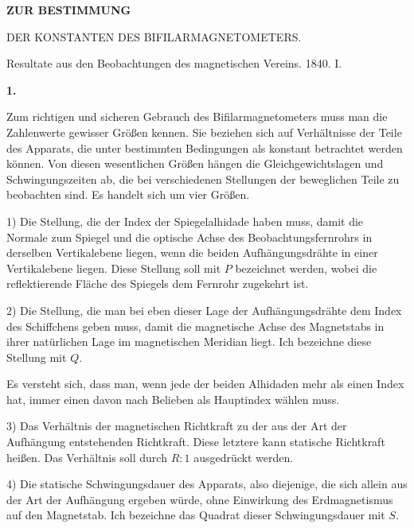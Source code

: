 \clearpage
{}
\begin{center}
{\Large\bfseries ZUR BESTIMMUNG\par\medskip DER KONSTANTEN DES BIFILARMAGNETOMETERS.}
\par\bigskip
Resultate aus den Beobachtungen des magnetischen Vereins. 1840. I.
\end{center}
\renewcommand{\Article}[1]{\par\medskip\Needspace{4\baselineskip}\pdfbookmark[1]{#1.}{bifilarconstanten-art-#1}\centerline{\textbf{#1.}}\nobreak\smallskip}%
\Article{1}
Zum richtigen und sicheren Gebrauch des Bifilarmagnetometers muss man die Zahlenwerte gewisser Größen kennen. Sie beziehen sich auf Verhältnisse der Teile des Apparats, die unter bestimmten Bedingungen als konstant betrachtet werden können. Von diesen wesentlichen Größen hängen die Gleichgewichtslagen und Schwingungszeiten ab, die bei verschiedenen Stellungen der beweglichen Teile zu beobachten sind. Es handelt sich um vier Größen.

1) Die Stellung, die der Index der Spiegelalhidade haben muss, damit die Normale zum Spiegel und die optische Achse des Beobachtungsfernrohrs in derselben Vertikalebene liegen, wenn die beiden Aufhängungsdrähte in einer Vertikalebene liegen. Diese Stellung soll mit $P$ bezeichnet werden, wobei die reflektierende Fläche des Spiegels dem Fernrohr zugekehrt ist.

2) Die Stellung, die man bei eben dieser Lage der Aufhängungsdrähte dem Index des Schiffchens geben muss, damit die magnetische Achse des Magnetstabs in ihrer natürlichen Lage im magnetischen Meridian liegt. Ich bezeichne diese Stellung mit $Q$.

Es versteht sich, dass man, wenn jede der beiden Alhidaden mehr als einen Index hat, immer einen davon nach Belieben als Hauptindex wählen muss.

3) Das Verhältnis der magnetischen Richtkraft zu der aus der Art der Aufhängung entstehenden Richtkraft. Diese letztere kann statische Richtkraft heißen. Das Verhältnis soll durch $R:1$ ausgedrückt werden.

4) Die statische Schwingungsdauer des Apparats, also diejenige, die sich allein aus der Art der Aufhängung ergeben würde, ohne Einwirkung des Erdmagnetismus auf den Magnetstab. Ich bezeichne das Quadrat dieser Schwingungsdauer mit $S$.

